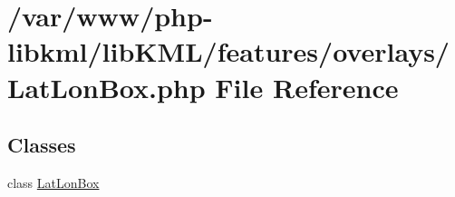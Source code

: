 \hypertarget{LatLonBox_8php}{
\section{/var/www/php-\/libkml/libKML/features/overlays/LatLonBox.php File Reference}
\label{d6/dd1/LatLonBox_8php}
}
\subsection*{Classes}
\begin{DoxyCompactItemize}
\item 
class \hyperlink{classLatLonBox}{LatLonBox}
\end{DoxyCompactItemize}
